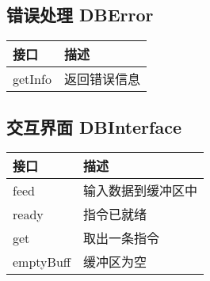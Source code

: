     \subsection{错误处理 DBError}
        \begin{tabularx}{\textwidth}{lX}
            \toprule
            接口 & 描述 \\
            \midrule
            getInfo & 返回错误信息 \\
            \bottomrule
        \end{tabularx}

    \subsection{交互界面 DBInterface}
        \begin{tabularx}{\textwidth}{lX}
            \toprule
            接口 & 描述 \\
            \midrule
            feed & 输入数据到缓冲区中 \\
            \midrule
            ready & 指令已就绪 \\
            \midrule
            get & 取出一条指令 \\
            \midrule
            emptyBuff & 缓冲区为空 \\
            \bottomrule
        \end{tabularx}


